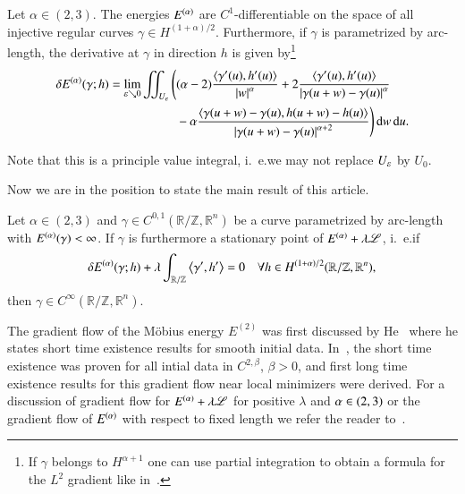 \begin{theorem} \label{thm:FrechetDifferential}
  Let $\alpha \in (2,3)$. The energies $\E$ are $C^1$-differentiable on the space of all
  injective regular curves $\gamma \in H^{(1+\alpha)/2}$. Furthermore, if $\gamma$
  is parametrized by arc-length, the derivative 
  at $\gamma$ in direction $h$ is given by\footnote{%
  If $\gamma$ belongs to $ H^{\alpha +1}$ one can use partial
  integration to obtain a formula for the $L^2$ gradient like in~\cite[Thm.~2.24]{reiter:rkepdc}.}%
  \begin{align*}
   \delta\E(\gamma;h) = \lim_{\varepsilon \searrow 0}  \iint_{U_\eps} \Bigg( &
    (\a-2) \frac{\sp{\dg(u),\dh(u)}}{\abs w^\a}
    + 2 \frac{\sp{\dg(u),\dh(u)}}{\abs{\D\g}^\a} \\
    &{}-\a \frac{\sp{\D\g,\D h}}{\abs{\D\g}^{\a+2}}
    \Bigg) \d w\d u.
  \end{align*}
\end{theorem}

Note that this is a principle value integral, i.~e.\@ we may not replace $U_\eps$ by $U_0$.

Now we are in the position to state the main result of this article.

\begin{theorem} \label{thm:rsp}
 Let $\alpha \in (2,3)$  and $\gamma\in C^{0,1}(\mathbb R / \mathbb Z, \mathbb R^n)$ be a curve
 parametrized by arc-length with $\E(\gamma)< \infty$. If $\gamma$ is furthermore a stationary
 point of $\E + \lambda \mathscr L$, i.~e.\@ if
 \begin{equation*}
  \delta \E(\gamma;h) + \lambda \int_{\mathbb R / \mathbb Z} \sp{\gamma',h'} =0 \quad \forall h \in \W[(1+\alpha)/2]
  (\mathbb R / \mathbb Z, \mathbb R^n),
 \end{equation*}
 then $\gamma \in C^\infty(\mathbb R / \mathbb Z, \mathbb R^n)$.
\end{theorem}

The gradient flow of the M\"obius energy $E^{(2)}$ was first discussed by He~\cite{he:elghf} where 
he states short time existence results for smooth initial data.
In~\cite{blatt:gfm}, the short time existence was proven for all intial data in $C^{2,\beta}$,
$\beta >0$, and first long time existence results for this gradient flow near local minimizers
were derived. 
For a discussion of gradient flow for  $\E+ \lambda\mathscr L$ for positive $\lambda$ and $\a\in(2,3)$
or the gradient flow of $\E$ with respect to fixed length we refer the reader to~\cite{blatt:gfoh}.

